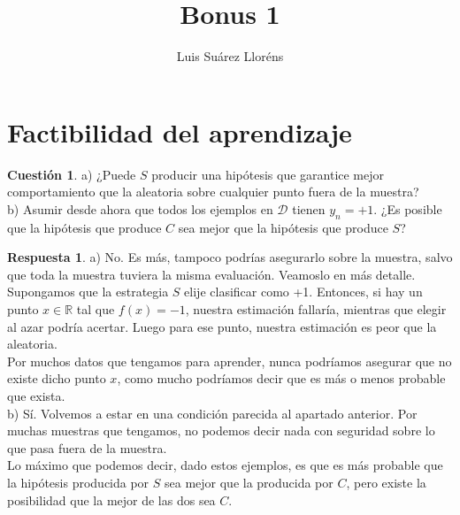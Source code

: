 \documentclass[10pt,a4paper]{article}
\author{Luis Suárez Lloréns}
\title{Bonus 1}
\date{}
\theoremstyle{definition}
\newtheorem*{cuestion}{Cuestión}
\newtheorem*{respuesta}{Respuesta}
\begin{document}
\maketitle

\section{Factibilidad del aprendizaje}
\begin{cuestion}
a) ¿Puede $S$ producir una hipótesis que garantice mejor comportamiento que la aleatoria sobre cualquier punto fuera de la muestra?\\
b) Asumir desde ahora que todos los ejemplos en $\mathcal{D}$ tienen $y_{n} = +1$. ¿Es posible que la hipótesis que produce $C$ sea mejor que la hipótesis que produce $S$?
\end{cuestion}
\begin{respuesta}
a) No. Es más, tampoco podrías asegurarlo sobre la muestra, salvo que toda la muestra tuviera la misma evaluación. Veamoslo en más detalle.\\

Supongamos que la estrategia $S$ elije clasificar como +1. Entonces, si hay un punto $x \in \mathbb{R}$ tal que $f(x) = -1$, nuestra estimación fallaría, mientras que elegir al azar podría acertar. Luego para ese punto, nuestra estimación es peor que la aleatoria.\\

Por muchos datos que tengamos para aprender, nunca podríamos asegurar que no existe dicho punto $x$, como mucho podríamos decir que es más o menos probable que exista.\\

b) Sí. Volvemos a estar en una condición parecida al apartado anterior. Por muchas muestras que tengamos, no podemos decir nada con seguridad sobre lo que pasa fuera de la muestra.\\

Lo máximo que podemos decir, dado estos ejemplos, es que es más probable que la hipótesis producida por $S$ sea mejor que la producida por $C$, pero existe la posibilidad que la mejor de las dos sea $C$.
\end{respuesta}

\newpage
\end{document}
